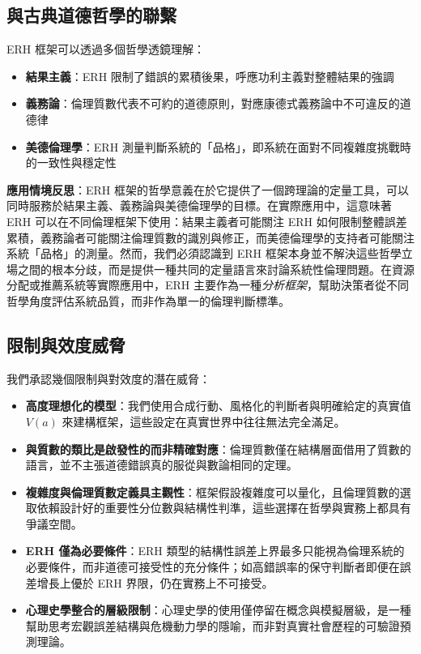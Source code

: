 \documentclass[12pt,a4paper]{article}
\theoremstyle{definition}
\theoremstyle{remark}
\begin{document}
\subsection{與古典道德哲學的聯繫}

ERH 框架可以透過多個哲學透鏡理解：
\begin{itemize}
    \item \textbf{結果主義}：ERH 限制了錯誤的累積後果，呼應功利主義對整體結果的強調 \citep{mill1863}
    \item \textbf{義務論}：倫理質數代表不可約的道德原則，對應康德式義務論中不可違反的道德律 \citep{kant1785}
    \item \textbf{美德倫理學}：ERH 測量判斷系統的「品格」，即系統在面對不同複雜度挑戰時的一致性與穩定性
\end{itemize}

\textbf{應用情境反思}：ERH 框架的哲學意義在於它提供了一個跨理論的定量工具，可以同時服務於結果主義、義務論與美德倫理學的目標。在實際應用中，這意味著 ERH 可以在不同倫理框架下使用：結果主義者可能關注 ERH 如何限制整體誤差累積，義務論者可能關注倫理質數的識別與修正，而美德倫理學的支持者可能關注系統「品格」的測量。然而，我們必須認識到 ERH 框架本身並不解決這些哲學立場之間的根本分歧，而是提供一種共同的定量語言來討論系統性倫理問題。在資源分配或推薦系統等實際應用中，ERH 主要作為一種\emph{分析框架}，幫助決策者從不同哲學角度評估系統品質，而非作為單一的倫理判斷標準。

\subsection{限制與效度威脅}

我們承認幾個限制與對效度的潛在威脅：
\begin{itemize}
    \item \textbf{高度理想化的模型}：我們使用合成行動、風格化的判斷者與明確給定的真實值 $V(a)$ 來建構框架，這些設定在真實世界中往往無法完全滿足。
    \item \textbf{與質數的類比是啟發性的而非精確對應}：倫理質數僅在結構層面借用了質數的語言，並不主張道德錯誤真的服從與數論相同的定理。
    \item \textbf{複雜度與倫理質數定義具主觀性}：框架假設複雜度可以量化，且倫理質數的選取依賴設計好的重要性分位數與結構性判準，這些選擇在哲學與實務上都具有爭議空間。
    \item \textbf{ERH 僅為必要條件}：ERH 類型的結構性誤差上界最多只能視為倫理系統的必要條件，而非道德可接受性的充分條件；如高錯誤率的保守判斷者即便在誤差增長上優於 ERH 界限，仍在實務上不可接受。
    \item \textbf{心理史學整合的層級限制}：心理史學的使用僅停留在概念與模擬層級，是一種幫助思考宏觀誤差結構與危機動力學的隱喻，而非對真實社會歷程的可驗證預測理論。
\end{itemize}
\end{document}
